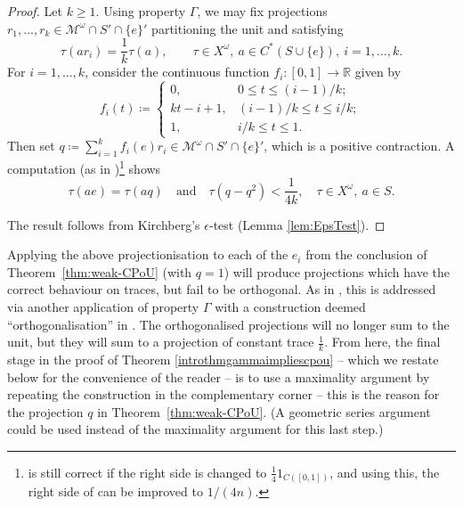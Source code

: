 \documentclass[a4paper,11pt]{amsart}
\theoremstyle{definition}
\numberwithin{equation}{section}
\numberwithin{theorem}{section}
\newcommand{\M}{\mathcal{M}}
\begin{document}
\begin{proof}
	Let $k \geq 1$.
 Using property $\Gamma$, we may fix projections $r_1, \ldots, r_k \in \M^\omega \cap S' \cap \{e\}'$ partitioning the unit and satisfying
	\begin{equation}
		\tau(ar_i) = \frac1k \tau(a), \qquad \tau \in X^\omega,\ a \in C^*(S \cup \{e\}),\ i = 1, \ldots, k.
	\end{equation}
	For $i = 1, \ldots, k$, consider the continuous function $f_i \colon [0, 1] \rightarrow \mathbb R$ given by
	\begin{equation}
		f_i(t) \coloneqq
		\begin{cases}
			0, & 0 \leq t \leq (i - 1)/k; \\
			kt - i + 1, & (i - 1)/k \leq t \leq i/k; \\
			1, & i/k \leq t \leq 1.
		\end{cases}
	\end{equation}
	Then set $q \coloneqq \sum_{i=1}^k f_i(e) r_i \in \M^\omega \cap S' \cap \{e\}'$, which is a positive contraction.  A computation (as in \cite[Equations (2.9) and (2.10)]{CETWW})\footnote{\cite[Equation (2.7)]{CETWW} is still correct if the right side is changed to $\frac14 1_{C([0,1])}$, and using this, the right side of \cite[Equation (2.10)]{CETWW} can be improved to $1/(4n)$.} shows
	\begin{equation}
		\tau(ae) = \tau(aq) \quad\text{and}\quad \tau(q - q^2) < \frac{1}{4k},\quad \tau \in X^\omega,\ a\in S.
	\end{equation}

 The result follows from Kirchberg's $\epsilon$-test (Lemma \ref{lem:EpsTest}).
\end{proof}



Applying the above projectionisation to each of the $e_i$ from the conclusion of Theorem~\ref{thm:weak-CPoU} (with $q=1$) will produce projections which have the correct behaviour on traces, but fail to be orthogonal. As in \cite{CETWW}, this is addressed via another application of property $\Gamma$ with a construction deemed ``orthogonalisation'' in \cite{CETWW}.  The orthogonalised projections will no longer sum to the unit, but they will sum to a projection of constant trace $\frac1k$.  From here, the final stage in the proof of Theorem \ref{introthmgammaimpliescpou} -- which we restate below for the convenience of the reader -- is to use a maximality argument by repeating the construction in the complementary corner -- this is the reason for the projection $q$ in Theorem~\ref{thm:weak-CPoU}. (A geometric series argument could be used instead of the maximality argument for this last step.)  
\end{document}
